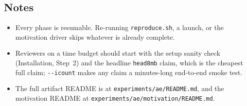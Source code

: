 \subsection{Notes}

\begin{itemize}
  \item Every phase is resumable. Re-running \texttt{reproduce.sh}, a launch, or
        the motivation driver skips whatever is already complete.
  \item Reviewers on a time budget should start with the setup sanity check
        (Installation, Step~2) and the headline \texttt{head8mb} claim, which is
        the cheapest full claim; \texttt{-{}-icount} makes any claim a
        minutes-long end-to-end smoke test.
  \item The full artifact README is at \texttt{experiments/ae/README.md}, and
        the motivation README at \texttt{experiments/ae/motivation/README.md}.
\end{itemize}
